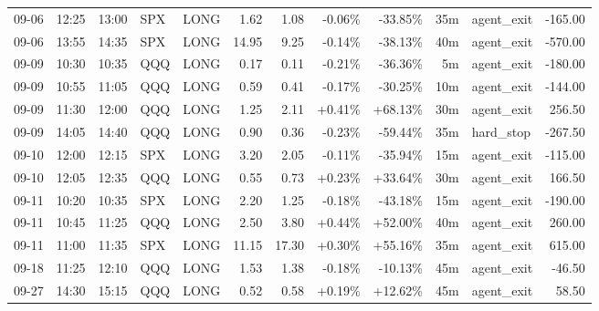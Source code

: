 \documentclass[11pt,a4paper,twoside]{article}
\begin{document}
\begin{center}
\begin{longtable}{>{\color{txtmain}}l l l l l r r r r r >{\color{txtmain}}l r}
09-06 & 12:25 & 13:00 & SPX & LONG & 1.62 & 1.08 & \textcolor{lossred}{-0.06\%} & \textcolor{lossred}{-33.85\%} & 35m & agent\_exit & \textcolor{lossred}{-165.00} \\
09-06 & 13:55 & 14:35 & SPX & LONG & 14.95 & 9.25 & \textcolor{lossred}{-0.14\%} & \textcolor{lossred}{-38.13\%} & 40m & agent\_exit & \textcolor{lossred}{-570.00} \\
09-09 & 10:30 & 10:35 & QQQ & LONG & 0.17 & 0.11 & \textcolor{lossred}{-0.21\%} & \textcolor{lossred}{-36.36\%} & 5m & agent\_exit & \textcolor{lossred}{-180.00} \\
09-09 & 10:55 & 11:05 & QQQ & LONG & 0.59 & 0.41 & \textcolor{lossred}{-0.17\%} & \textcolor{lossred}{-30.25\%} & 10m & agent\_exit & \textcolor{lossred}{-144.00} \\
09-09 & 11:30 & 12:00 & QQQ & LONG & 1.25 & 2.11 & \textcolor{wingreen}{+0.41\%} & \textcolor{wingreen}{+68.13\%} & 30m & agent\_exit & \textcolor{wingreen}{256.50} \\
09-09 & 14:05 & 14:40 & QQQ & LONG & 0.90 & 0.36 & \textcolor{lossred}{-0.23\%} & \textcolor{lossred}{-59.44\%} & 35m & hard\_stop & \textcolor{lossred}{-267.50} \\
09-10 & 12:00 & 12:15 & SPX & LONG & 3.20 & 2.05 & \textcolor{lossred}{-0.11\%} & \textcolor{lossred}{-35.94\%} & 15m & agent\_exit & \textcolor{lossred}{-115.00} \\
09-10 & 12:05 & 12:35 & QQQ & LONG & 0.55 & 0.73 & \textcolor{wingreen}{+0.23\%} & \textcolor{wingreen}{+33.64\%} & 30m & agent\_exit & \textcolor{wingreen}{166.50} \\
09-11 & 10:20 & 10:35 & SPX & LONG & 2.20 & 1.25 & \textcolor{lossred}{-0.18\%} & \textcolor{lossred}{-43.18\%} & 15m & agent\_exit & \textcolor{lossred}{-190.00} \\
09-11 & 10:45 & 11:25 & QQQ & LONG & 2.50 & 3.80 & \textcolor{wingreen}{+0.44\%} & \textcolor{wingreen}{+52.00\%} & 40m & agent\_exit & \textcolor{wingreen}{260.00} \\
09-11 & 11:00 & 11:35 & SPX & LONG & 11.15 & 17.30 & \textcolor{wingreen}{+0.30\%} & \textcolor{wingreen}{+55.16\%} & 35m & agent\_exit & \textcolor{wingreen}{615.00} \\
09-18 & 11:25 & 12:10 & QQQ & LONG & 1.53 & 1.38 & \textcolor{lossred}{-0.18\%} & \textcolor{lossred}{-10.13\%} & 45m & agent\_exit & \textcolor{lossred}{-46.50} \\
09-27 & 14:30 & 15:15 & QQQ & LONG & 0.52 & 0.58 & \textcolor{wingreen}{+0.19\%} & \textcolor{wingreen}{+12.62\%} & 45m & agent\_exit & \textcolor{wingreen}{58.50} \\

\end{longtable}
\end{center}
\end{document}
